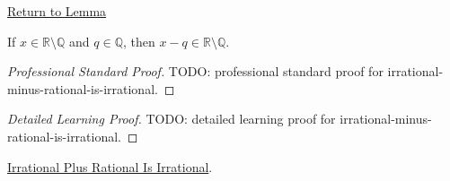 \newpage
{}
\label{prf:irrational-minus-rational-is-irrational}

\begin{remark*}[Return]
\hyperref[lem:irrational-minus-rational-is-irrational]{Return to Lemma}
\end{remark*}

\begin{lemma*}
If $x\in\mathbb{R}\setminus\mathbb{Q}$ and $q\in\mathbb{Q}$, then
$x-q\in\mathbb{R}\setminus\mathbb{Q}$.
\end{lemma*}

\begin{proof}[Professional Standard Proof]
\LRAProofBodyStart
TODO: professional standard proof for irrational-minus-rational-is-irrational.
\end{proof}

\begin{proof}[Detailed Learning Proof]
\LRAProofBodyStart
TODO: detailed learning proof for irrational-minus-rational-is-irrational.
\end{proof}

\begin{remark*}
\end{remark*}

\begin{dependencies}
\hyperref[lem:irrational-plus-rational-is-irrational]{Irrational Plus Rational Is Irrational}.
\end{dependencies}

\clearpage
